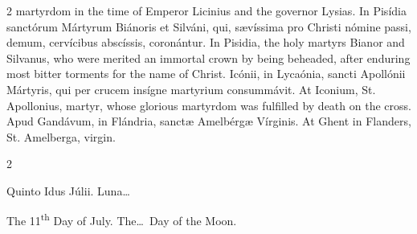 \begin{paracol}{2}
 martyrdom in the time of Emperor Licinius and the governor Lysias.
\switchcolumn*
{}
In Pisídia sanctórum 
 Mártyrum Biánoris et Silváni, qui, sævíssima pro Christi nómine passi, demum, 
 cervícibus abscíssis, coronántur.
\switchcolumn
{}
In Pisidia, the holy martyrs Bianor 
 and Silvanus, who were merited an immortal crown by being beheaded, after 
 enduring most bitter torments for the name of Christ.
\switchcolumn*
{}
Icónii, in Lycaónia, 
 sancti Apollónii Mártyris, qui per crucem insígne martyrium consummávit.
\switchcolumn
{}
At Iconium, St. Apollonius, martyr, 
 whose glorious martyrdom was fulfilled by death on the cross.
\switchcolumn*
{}
Apud Gandávum, in 
 Flándria, sanctæ Amelbérgæ Vírginis.
\switchcolumn
{}
At Ghent in Flanders, St. Amelberga, 
 virgin.
\switchcolumn*
{}
\end{paracol}


\begin{paracol}{2}
\begin{center}{\color{gregoriocolor} Quinto Idus Júlii. 
 Luna\dots\ }\end{center}
\switchcolumn
{}
\begin{center}{\color{gregoriocolor} The 
 11\textsuperscript{th} Day of 
 July. The\dots\ Day of the Moon.}\end{center}
\end{paracol}

